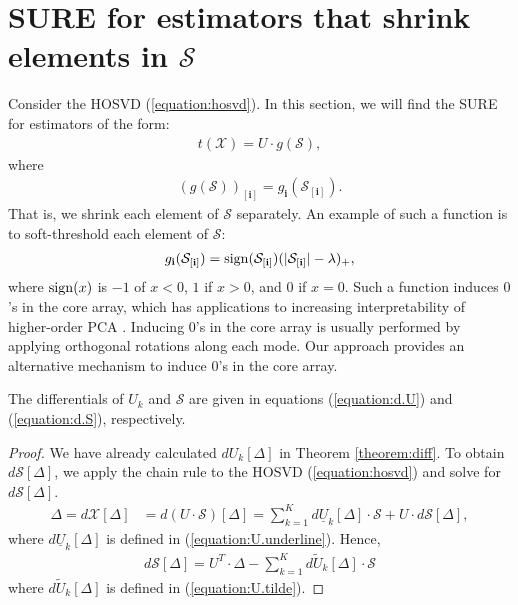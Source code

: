 \section{SURE for estimators that shrink elements in $\mathcal{S}$}
\label{sec:sure.s.shrink}
Consider the HOSVD (\ref{equation:hosvd}). In this section, we will
find the SURE for estimators of the form:
\begin{align}
  \label{equation:hose.s}
  t(\mathcal{X}) = U \cdot g(\mathcal{S}),
\end{align}
where
\begin{align*}
  (g(\mathcal{S}))_{[\mathbf{i}]} = g_{\mathbf{i}}(\mathcal{S}_{[\mathbf{i}]}).
\end{align*}
That is, we shrink each element of $\mathcal{S}$ separately. An
example of such a function is to soft-threshold each element of
$\mathcal{S}$:
\begin{align*}
  g_{\mathbf{i}}(\mathcal{S}_{[\mathbf{i}]}) = \operatorname*{sign}(\mathcal{S}_{[\mathbf{i}]})(|\mathcal{S}_{[\mathbf{i}]}| - \lambda)_+,
\end{align*}
where $\operatorname*{sign}(x)$ is $-1$ of $x < 0$, $1$ if $x > 0$, and $0$ if $x =
0$. Such a function induces $0$'s in the core array, which has
applications to increasing interpretability of higher-order PCA
\citep{henrion1993body,kiers1997uniqueness,murakami1998case,andersson1999general,de2001independent,martin2008jacobi}. Inducing
$0$'s in the core array is usually performed by applying orthogonal
rotations along each mode. Our approach provides an alternative
mechanism to induce $0$'s in the core array.



\begin{theorem}
  The differentials of $U_k$ and $\mathcal{S}$ are given in equations
  (\ref{equation:d.U}) and (\ref{equation:d.S}), respectively.
\end{theorem}
\begin{proof}
  We have already calculated $dU_k[\Delta]$ in Theorem
  \ref{theorem:diff}. To obtain $d\mathcal{S}[\Delta]$, we apply the
  chain rule to the HOSVD (\ref{equation:hosvd}) and solve for
  $d\mathcal{S}[\Delta]$.
\begin{align*}
  \Delta = d\mathcal{X}[\Delta] &= d(U\cdot \mathcal{S})[\Delta] =\sum_{k=1}^Kd\underline{U}_k[\Delta] \cdot \mathcal{S} + U \cdot d\mathcal{S}[\Delta],
\end{align*}
where $d\underline{U}_k[\Delta]$ is defined in (\ref{equation:U.underline}). Hence,
\begin{align}
  \label{equation:d.S}
  d\mathcal{S}[\Delta] =  U^T \cdot \Delta - \sum_{k=1}^K d\tilde{U}_k[\Delta]\cdot \mathcal{S}
\end{align}
where $d\tilde{U}_k[\Delta]$ is defined in (\ref{equation:U.tilde}).
\end{proof}

